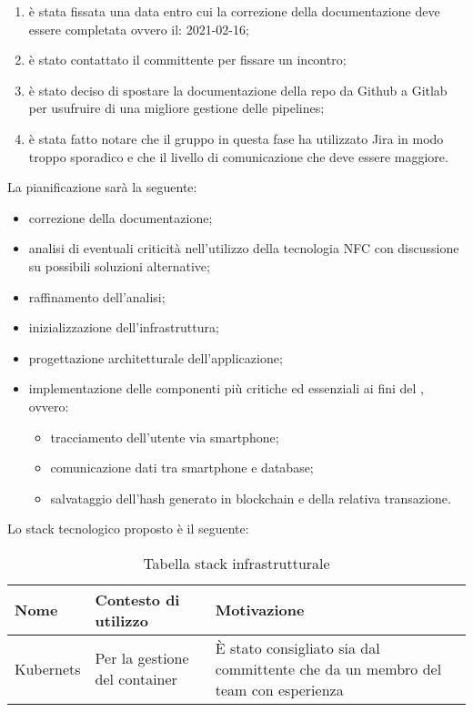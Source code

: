 \begin{enumerate}
    \item è stata fissata una data entro cui la correzione della documentazione deve essere completata ovvero il: 2021-02-16;
    \item è stato contattato il committente per fissare un incontro;
    \item è stato deciso di spostare la documentazione della repo da Github a Gitlab per usufruire di una migliore gestione delle pipelines;
    \item è stata fatto notare che il gruppo in questa fase ha utilizzato Jira in modo troppo sporadico e che il livello di 
    comunicazione che deve essere maggiore.
\end{enumerate}

    La pianificazione sarà la seguente:
    \begin{itemize}
    \item correzione della documentazione;
    \item analisi di eventuali criticità nell'utilizzo della tecnologia NFC con discussione su possibili soluzioni alternative;
    \item raffinamento dell'analisi;
    \item inizializzazione dell'infrastruttura;
    \item progettazione architetturale dell'applicazione;
    \item implementazione delle componenti più critiche ed essenziali ai fini del , ovvero:
        \begin{itemize}
            \item tracciamento dell'utente via smartphone;
            \item comunicazione dati tra smartphone e database;
            \item salvataggio dell'hash generato in blockchain e della relativa transazione.
        \end{itemize}
    \end{itemize}
    Lo stack tecnologico proposto è il seguente:
	\renewcommand{\arraystretch}{2}
    \begin{longtable}{ C{5cm} C{4cm} C{5cm} }
        \caption{Tabella stack infrastrutturale}                                                                                 \\
        \rowcolor{\primaryColor}
        \textcolor{\secondaryColor}{\textbf{Nome}} & \textcolor{\secondaryColor}{\textbf{Contesto di utilizzo}} & \textcolor{\secondaryColor}{\textbf{Motivazione}}\\ \endhead
        {Kubernets} & {Per la gestione del container}   & {È stato consigliato sia dal committente che da un membro del team con esperienza}\\
    \end{longtable}

